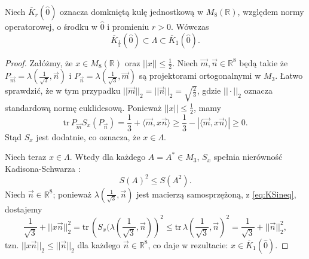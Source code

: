 {\begin{Theorem}
\label{thm:LambdaAndBalls}
    Niech $\overline{K}_{r}(\hat{0})$ oznacza domkniętą kulę jednostkową
w $M_{8}(\mathbb{R})$, względem normy operatorowej,
o środku w $\hat{0}$ i promieniu $r > 0$.
    Wówczas
    \begin{equation}
        \overline{K}_{\frac{1}{2}}(\hat{0})
            \subset \Lambda \subset \overline{K}_{1}(\hat{0}).
    \end{equation}
\end{Theorem}
\begin{proof}
    Załóżmy, że $x \in M_{8}(\mathbb{R})$ oraz $||x|| \leq \frac{1}{2}$.
    Niech $\vec{m}, \vec{n} \in \mathbb{R}^{8}$ będą takie że
    $P_{\vec{m}} = \lambda(\frac{1}{\sqrt{3}}, \vec{n})$ i
    $P_{\vec{n}} = \lambda(\frac{1}{\sqrt{3}}, \vec{m})$
    są projektorami ortogonalnymi w $M_{3}$.
Łatwo sprawdzić, że w tym przypadku
    $|| \vec{m} ||_{2} = || \vec{n} ||_{2} = \sqrt{\frac{2}{3}}$,
gdzie  $|| \cdot||_{2}$ oznacza standardową normę euklidesową.
Ponieważ $||x|| \leq \frac{1}{2}$, mamy
    \begin{equation}
        \text{tr} \, P_{\vec{m}} S_{x}(P_{\vec{n}}) =
        \frac{1}{3} + \langle \vec{m}, x \vec{n} \rangle \geq
        \frac{1}{3} - |\langle \vec{m}, x \vec{n} \rangle| \geq 0.
    \end{equation}
Stąd $S_{x}$ jest dodatnie, co oznacza, że $x \in \Lambda$.

Niech teraz $x \in \Lambda$.
Wtedy dla każdego $A = A^{*} \in M_{3}$, $S_{x}$
spełnia nierówność Kadisona-Schwarza
    \cite{choi1980some}:
    \begin{equation}
     \label{eq:KSineq}
        S(A)^{2} \leq S(A^{2}).
    \end{equation}
Niech $\vec{n} \in \mathbb{R}^{8}$;
ponieważ $\lambda(\frac{1}{\sqrt{3}}, \vec{n})$
jest macierzą samosprzężoną, z \eqref{eq:KSineq}, dostajemy
    \begin{equation}
        \frac{1}{\sqrt{3}} + || x \vec{n} ||_{2}^{2} = \text{tr}\,
        \left ( S_{x}(\lambda(\frac{1}{\sqrt{3}}, \vec{n}) \right)^{2} \leq
        \text{tr}\, \lambda(\frac{1}{\sqrt{3}}, \vec{n})^{2} =
        \frac{1}{\sqrt{3}} + ||\vec{n}||_{2}^{2},
    \end{equation}
tzn. $||x\vec{n}||_{2} \leq ||\vec{n}||_{2}$
dla każdego $\vec{n} \in \mathbb{R}^{8}$,
co daje w rezultacie: $x \in \overline{K}_{1}(\hat{0})$.
\end{proof}

}
